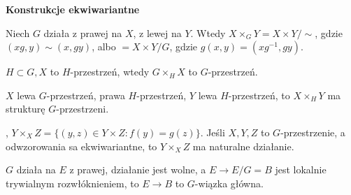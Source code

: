 

 

 {\bf Konstrukcje ekwiwariantne}

 \begin{definicja}
  Niech $G$ działa z prawej na $X$, z lewej na $Y$. Wtedy $X \times_G Y = X \times Y / \sim$, gdzie $(xg, y) \sim (x,gy)$, albo $=X \times Y / G$, gdzie $g(x,y) = (xg^{-1}, gy)$.
 \end{definicja}
 
 \begin{definicja}
  $H \subset G, X$ to $H$-przestrzeń, wtedy $G \times_H X$ to $G$-przestrzeń.
 \end{definicja}
 
 \begin{uwaga}
  $X$ lewa $G$-przestrzeń, prawa $H$-przestrzeń, $Y$ lewa $H$-przestrzeń, to $X \times_H Y$ ma strukturę $G$-przestrzeni.
 \end{uwaga}
 
 \begin{definicja}, $Y \times_X Z = \{ (y,z) \in Y \times Z: f(y) = g(z) \}$.
 Jeśli $X,Y,Z$ to $G$-przestrzenie, a odwzorowania sa ekwiwariantne, to $Y \times_X Z$ ma naturalne działanie.
 \end{definicja}
 
 \begin{definicja}
 \end{definicja}
 
 \begin{definicja}
  $G$ działa na $E$ z prawej, działanie jest wolne, a $E \to E/G=B$ jest lokalnie trywialnym rozwłóknieniem, to $E\to B$ to $G$-wiązka główna.
 \end{definicja}
 
